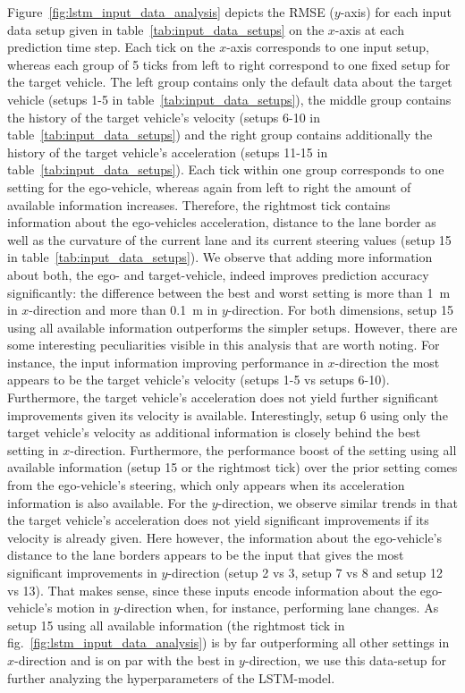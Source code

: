 Figure~\ref{fig:lstm_input_data_analysis} depicts the \ac{RMSE} ($y$-axis) for each input data setup given in table~\ref{tab:input_data_setups} on the $x$-axis at each prediction time step.
Each tick on the $x$-axis corresponds to one input setup, whereas each group of \num{5} ticks from left to right correspond to one fixed setup for the target vehicle.
The left group contains only the default data about the target vehicle (setups \num{1}-\num{5} in table~\ref{tab:input_data_setups}), the middle group contains the history of the target vehicle's velocity (setups \num{6}-\num{10} in table~\ref{tab:input_data_setups}) and the right group contains additionally the history of the target vehicle's acceleration (setups \num{11}-\num{15} in table~\ref{tab:input_data_setups}).
Each tick within one group corresponds to one setting for the ego-vehicle, whereas again from left to right the amount of available information increases.
Therefore, the rightmost tick contains information about the ego-vehicles acceleration, distance to the lane border as well as the curvature of the current lane and its current steering values (setup \num{15} in table~\ref{tab:input_data_setups}). 
We observe that adding more information about both, the ego- and target-vehicle, indeed improves prediction accuracy significantly: the difference between the best and worst setting is more than \SI{1}{\meter} in $x$-direction and more than \SI{0.1}{\meter} in $y$-direction.
For both dimensions, setup \num{15} using all available information outperforms the simpler setups.
However, there are some interesting peculiarities visible in this analysis that are worth noting.
For instance, the input information improving performance in $x$-direction the most appears to be the target vehicle's velocity (setups \num{1}-\num{5} vs setups \num{6}-\num{10}). 
Furthermore, the target vehicle's acceleration does not yield further significant improvements given its velocity is available.
Interestingly, setup \num{6} using only the target vehicle's velocity as additional information is closely behind the best setting in $x$-direction.
Furthermore, the performance boost of the setting using all available information (setup \num{15} or the rightmost tick) over the prior setting comes from the ego-vehicle's steering, which only appears when its acceleration information is also available.
For the $y$-direction, we observe similar trends in that the target vehicle's acceleration does not yield significant improvements if its velocity is already given.
Here however, the information about the ego-vehicle's distance to the lane borders appears to be the input that gives the most significant improvements in $y$-direction (setup \num{2} vs \num{3}, setup \num{7} vs \num{8} and setup \num{12} vs \num{13}).
That makes sense, since these inputs encode information about the ego-vehicle's motion in $y$-direction when, for instance, performing lane changes.
As setup \num{15} using all available information (the rightmost tick in fig.~\ref{fig:lstm_input_data_analysis}) is by far outperforming all other settings in $x$-direction and is on par with the best in $y$-direction, we use this data-setup for further analyzing the hyperparameters of the \ac{LSTM}-model.

